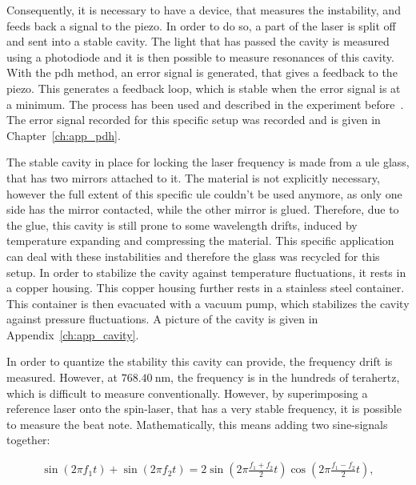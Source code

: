 Consequently, it is necessary to have a device, that measures the instability, and feeds back a signal to the piezo. In order to do so, a part of the laser is split off and sent into a stable cavity. The light that has passed the cavity is measured using a photodiode and it is then possible to measure resonances of this cavity. With the \ac{pdh} method, an error signal is generated, that gives a feedback to the piezo. This generates a feedback loop, which is stable when the error signal is at a minimum. The process has been used and described in the experiment before~\cite{Hirthe2018}. The error signal recorded for this specific setup was recorded and is given in Chapter~\ref{ch:app_pdh}.

The stable cavity in place for locking the laser frequency is made from a \ac{ule} glass, that has two mirrors attached to it. The material is not explicitly necessary, however the full extent of this specific \ac{ule} couldn't be used anymore, as only one side has the mirror contacted, while the other mirror is glued. Therefore, due to the glue, this cavity is still prone to some wavelength drifts, induced by temperature expanding and compressing the material. This specific application can deal with these instabilities and therefore the glass was recycled for this setup. In order to stabilize the cavity against temperature fluctuations, it rests in a copper housing. This copper housing further rests in a stainless steel container. This container is then evacuated with a vacuum pump, which stabilizes the cavity against pressure fluctuations. A picture of the cavity is given in Appendix~\ref{ch:app_cavity}.

In order to quantize the stability this cavity can provide, the frequency drift is measured. However, at $\SI{768.40}{\nano\meter}$, the frequency is in the hundreds of terahertz, which is difficult to measure conventionally. However, by superimposing a reference laser onto the spin-laser, that has a very stable frequency, it is possible to measure the beat note. Mathematically, this means adding two sine-signals together:

\begin{align}
	\sin{\left(2\pi f_1 t\right)} + \sin{\left( 2 \pi f_2 t \right)}
	= 2 \sin{\left( 2\pi \frac{f_1+f_2}{2}t \right)} \cos{\left( 2\pi \frac{f_1-f_2}{2}t \right)},
\end{align}

